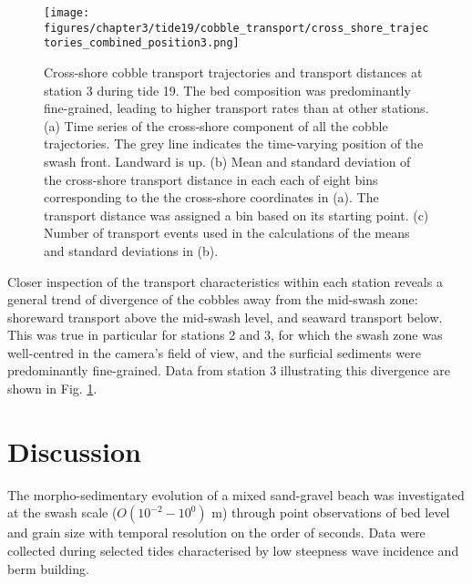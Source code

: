 \begin{figure}[tbp] %
  	\texttt{[image: figures/chapter3/tide19/cobble\_transport/cross\_shore\_trajectories\_combined\_position3.png]}
 	\caption[Cross-shore cobble transport trajectories and distances]{Cross-shore cobble transport trajectories and transport distances at station 3 during tide 19. The bed composition was predominantly fine-grained, leading to higher transport rates than at other stations. (a) Time series of the cross-shore component of all the cobble trajectories. The grey line indicates the time-varying position of the swash front. Landward  is up. (b) Mean and standard deviation of the cross-shore transport distance in each each of eight bins corresponding to the the cross-shore coordinates in (a). The transport distance was assigned a bin based on its starting point. (c) Number of transport events used in the calculations of the means and standard deviations in (b).}
 	\label{fig:cobble_transport_station3}
\end{figure}

Closer inspection of the transport characteristics within each station reveals a general trend of divergence of the cobbles away from the mid-swash zone: shoreward transport above the mid-swash level, and seaward transport below. This was true in particular for stations 2 and 3, for which the swash zone was well-centred in the camera's field of view, and the surficial sediments were predominantly fine-grained. Data from station 3 illustrating this divergence are shown in Fig. \ref{fig:cobble_transport_station3}. %


\section{Discussion}\label{section:discussion}

The morpho-sedimentary evolution of a mixed sand-gravel beach was investigated at the swash scale ($O(10^{-2}-10^0)$ m) through point observations of bed level and grain size with temporal resolution on the order of seconds. Data were collected during selected tides characterised by low steepness wave incidence and berm building.  %

